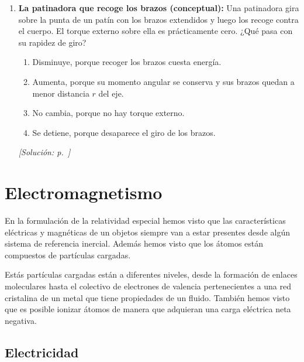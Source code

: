 \documentclass[11pt,a4paper]{book}
\begin{document}
\begin{enumerate}[label=\textbf{P\arabic*.}, ref=P\arabic*, leftmargin=*]
    \item\label{prob:parcial2-patinadora} \textbf{La patinadora que recoge
    los brazos (conceptual):} Una patinadora gira sobre la punta de un patín
    con los brazos extendidos y luego los recoge contra el cuerpo. El torque
    externo sobre ella es prácticamente cero. ¿Qué pasa con su rapidez de
    giro?
    \begin{enumerate}[label=\alph*)]
        \item Disminuye, porque recoger los brazos cuesta energía.
        \item Aumenta, porque su momento angular se conserva y sus brazos
        quedan a menor distancia $r$ del eje.
        \item No cambia, porque no hay torque externo.
        \item Se detiene, porque desaparece el giro de los brazos.
    \end{enumerate}
    \hfill\textit{[Solución: p.~\pageref{sol:parcial2-patinadora}]}

\end{enumerate}


\chapter{Electromagnetismo}

En la formulación de la relatividad especial hemos visto que las características eléctricas y magnéticas de un objetos siempre van a estar presentes desde algún sistema de referencia inercial. Además hemos visto que los átomos están compuestos de partículas cargadas.

Estás partículas cargadas están a diferentes niveles, desde la formación de enlaces moleculares hasta el colectivo de electrones de valencia pertenecientes a una red cristalina de un metal que tiene propiedades de un fluido. También hemos visto que es posible ionizar átomos de manera que adquieran una carga eléctrica neta negativa. 

\section{Electricidad}
\end{document}
